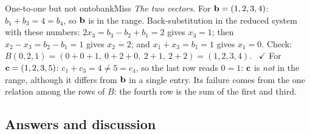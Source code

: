 \documentclass[11pt]{article}
\begin{document}
\begin{exmp}{One-to-one but not onto}{bankMiss}
\emph{The two vectors.} For $\mathbf{b}=(1,2,3,4)$: $b_1+b_3=4=b_4$, so $\mathbf{b}$ is in the range. Back-substitution in the reduced system with these numbers: $2x_3=b_3-b_2+b_1=2$ gives $x_3=1$; then $x_2-x_3=b_2-b_1=1$ gives $x_2=2$; and $x_1+x_3=b_1=1$ gives $x_1=0$. Check: $B(0,2,1)=(0+0+1,\ 0+2+0,\ 2+1,\ 2+2)=(1,2,3,4)$. \ $\checkmark$ For $\mathbf{c}=(1,2,3,5)$: $c_1+c_3=4\neq5=c_4$, so the last row reads $0=1$: $\mathbf{c}$ is \emph{not} in the range, although it differs from $\mathbf{b}$ in a single entry. Its failure comes from the one relation among the rows of $B$: the fourth row is the sum of the first and third.
\end{exmp}

\subsection*{Answers and discussion}
\end{document}
